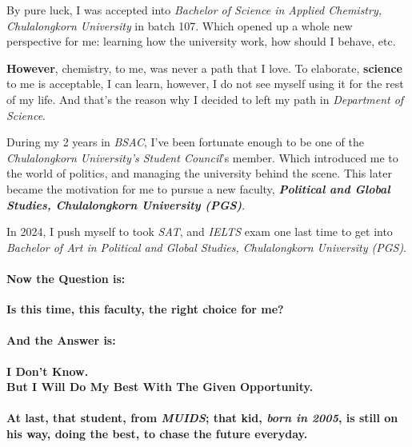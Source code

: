 \documentclass[11pt]{book}
\begin{document}
By pure luck, I was accepted into \textit{Bachelor of Science in Applied Chemistry, Chulalongkorn University} in batch 107. Which opened up a whole new perspective for me: learning how the university work, how should I behave, etc.

\textbf{However}, chemistry, to me, was never a path that I love. To elaborate, \textbf{science} to me is acceptable, I can learn, however,  I do not see myself using it for the rest of my life. And that's the reason why I decided to left my path in \textit{Department of Science}.

During my 2 years in \textit{BSAC}, I've been fortunate enough to be one of the \textit{Chulalongkorn University's Student Council}'s member. Which  introduced me to the world of politics, and managing the university behind the scene. This later became the motivation for me to pursue a new faculty, \textbf{\textit{Political and Global Studies, Chulalongkorn University (PGS)}}. 

In 2024, I push myself to took \textit{SAT}, and \textit{IELTS} exam one last time to get into \textit{Bachelor of Art in Political and Global Studies, Chulalongkorn University (PGS)}.
\\

\paragraph{Now the Question is:}
	\begin{center}
		\textbf{Is this time, this faculty, the right choice for me?}\\
	\end{center}

	\begin{flushright}
		\paragraph{And the Answer is:}
	\end{flushright}

	\begin{center}
			\textbf{I Don't Know.}\\
			\textbf{But I Will Do My Best With The Given Opportunity.}
	\end{center}
	
	\begin{center}
		\paragraph{At last, that student, from \textit{MUIDS}; that kid, \textit{born in 2005}, is still on his way, doing the best, to chase the future everyday.}
	\end{center}
\end{document}
